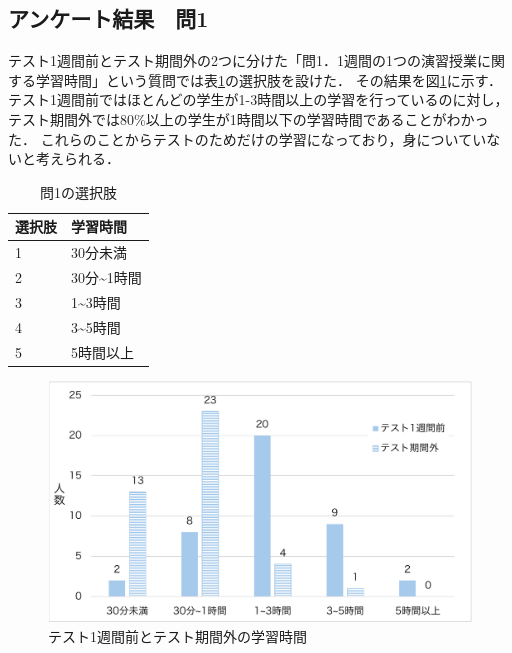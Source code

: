 \documentclass[12pt,a4j,titlepage]{ltjsarticle}
\begin{document}
\clearpage

\subsection{アンケート結果　問1}
テスト1週間前とテスト期間外の2つに分けた「問1．1週間の1つの演習授業に関する学習時間」という質問では表\ref{tb:anke1_1}の選択肢を設けた．
その結果を図\ref{fig:benkyo}に示す．
テスト1週間前ではほとんどの学生が1-3時間以上の学習を行っているのに対し，テスト期間外では80\%以上の学生が1時間以下の学習時間であることがわかった．
これらのことからテストのためだけの学習になっており，身についていないと考えられる．

\begin{table}[htbp]
  \caption{問1の選択肢}
  \begin{center}
\begin{tabular}{ll}\hline
               選択肢 & 学習時間 \\ \hline
               1 & 30分未満\\
               2 & 30分\textasciitilde1時間\\
               3 & 1\textasciitilde3時間\\
               4 & 3\textasciitilde5時間\\
               5 & 5時間以上\\
              \hline
               \end{tabular}
               \end{center}
               \label{tb:anke1_1}
               \end{table}

\begin{figure}[!htb]
  \centering
  \includegraphics[width=15cm]{学習時間.pdf}
  \caption{テスト1週間前とテスト期間外の学習時間}
  \label{fig:benkyo}
\end{figure}
\end{document}

